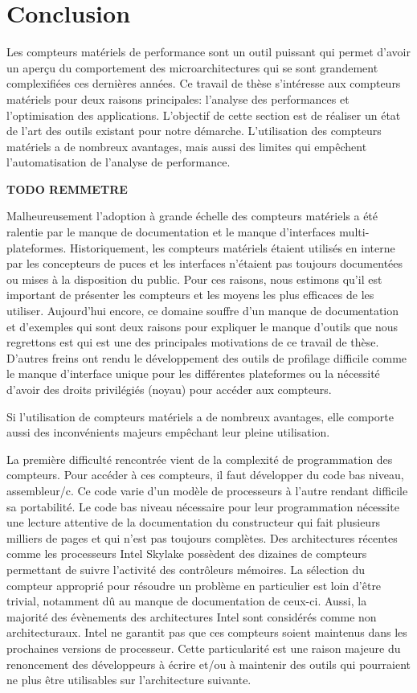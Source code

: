 \section{Conclusion}

    Les compteurs matériels de performance sont un outil puissant qui permet d'avoir un aperçu du comportement des microarchitectures qui se sont grandement complexifiées ces dernières années. Ce travail de thèse s'intéresse aux compteurs matériels pour deux raisons principales: l'analyse des performances et l'optimisation des applications. L'objectif de cette section est de réaliser un état de l'art des outils existant pour notre démarche. L'utilisation des compteurs matériels a de nombreux avantages, mais aussi des limites qui empêchent l'automatisation de l'analyse de performance. 



\textbf{TODO REMMETRE}

     
           Malheureusement l'adoption à grande échelle des compteurs matériels a été ralentie par le manque de documentation et le manque d'interfaces multi-plateformes. Historiquement, les compteurs matériels étaient utilisés en interne par les concepteurs de puces et les interfaces n'étaient pas toujours documentées ou mises à la disposition du public. Pour ces raisons, nous estimons qu'il est important de présenter les compteurs et les moyens les plus efficaces de les utiliser. Aujourd'hui encore, ce domaine souffre d'un manque de documentation et d'exemples qui sont deux raisons pour expliquer le manque d'outils que nous regrettons est qui est une des principales motivations de ce travail de thèse. D'autres freins ont rendu le développement des outils de profilage difficile comme le manque d'interface unique pour les différentes plateformes ou la nécessité d'avoir des droits privilégiés (noyau) pour accéder aux compteurs. 
                       
            Si l'utilisation de compteurs matériels a de nombreux avantages, elle comporte aussi des inconvénients majeurs empêchant leur pleine utilisation. 
            
                La première difficulté rencontrée vient de la complexité de programmation des compteurs. Pour accéder à ces compteurs, il faut développer du code bas niveau, assembleur/c. Ce code varie d'un modèle de processeurs à l'autre rendant difficile sa portabilité. Le code bas niveau nécessaire pour leur programmation nécessite une lecture attentive de la documentation du constructeur qui fait plusieurs milliers de pages et qui n'est pas toujours complètes. Des architectures récentes comme les processeurs Intel Skylake possèdent des dizaines de compteurs permettant de suivre l'activité des contrôleurs mémoires. La sélection du compteur approprié pour résoudre un problème en particulier est loin d'être trivial, notamment dû au manque de documentation de ceux-ci. Aussi, la majorité des évènements des architectures Intel sont considérés comme non architecturaux. Intel ne garantit pas que ces compteurs soient maintenus dans les prochaines versions de processeur. Cette particularité est une raison majeure du renoncement des développeurs à écrire et/ou à maintenir des outils qui pourraient ne plus être utilisables sur l'architecture suivante.
            
